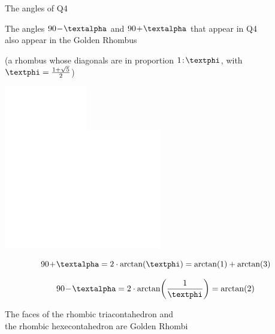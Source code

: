 \documentclass[14pt]{beamer}
\begin{document}
    \begin{frame}{The angles of Q4}
        \begin{center}
            The angles $90\!-\!\text{\textalpha}$ and $90\!+\!\text{\textalpha}$ that appear in Q4\\also appear in the Golden Rhombus

            \medskip

            {\footnotesize(a rhombus whose diagonals are in proportion $1\!:\!\text{\textphi}$, with $\text{\textphi} =\tfrac{1+\sqrt{5}}{2}$)}

            \bigskip

            \begin{minipage}{16ex}\vspace{2ex}
                \includegraphics[height=15ex]{figures/figure007a.pdf}\includegraphics[height=15ex]{figures/figure007b.pdf}\\
            \end{minipage}\quad\begin{minipage}{25ex}
                \footnotesize
                $$90\!+\!\text{\textalpha} = 2\cdot\arctan{\!\left(\text{\textphi}\right)} = \arctan{\!\left(1\right)} + \arctan{\!\left(3\right)}$$

                $$90\!-\!\text{\textalpha} = 2\cdot\arctan{\!\left(\frac{1}{\text{\textphi}}\right)} = \arctan{\!\left(2\right)}$$

                \bigskip
            \end{minipage}

            {\footnotesize The faces of the rhombic triacontahedron and\\the rhombic hexecontahedron are Golden Rhombi}
        \end{center}
    \end{frame}

\end{document}
